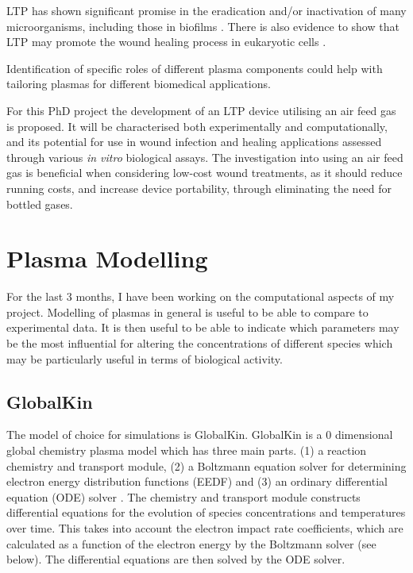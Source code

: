 \documentclass[11pt, oneside]{article}   	%
\begin{document}
LTP has shown significant promise in the eradication and/or inactivation of many microorganisms, including those in biofilms \cite{Laroussi2005low}. 
There is also evidence to show that LTP may promote the wound healing process in eukaryotic cells \cite{Haertel2014nonthermal, Kramer2013suitability}.


Identification of specific roles of different plasma components could help with tailoring plasmas for different biomedical applications.

For this PhD project the development of an LTP device utilising an air feed gas is proposed.
It will be characterised both experimentally and computationally, and its potential for use in wound infection and healing applications assessed through various \textit{in vitro} biological assays.
The investigation into using an air feed gas is beneficial when considering low-cost wound treatments, as it should reduce running costs, and increase device portability, through eliminating the need for bottled gases.

\section*{Plasma Modelling}
For the last 3 months, I have been working on the computational aspects of my project.
Modelling of plasmas in general is useful to be able to compare to experimental data. 
It is then useful to be able to indicate which parameters may be the most influential for altering the concentrations of different species which may be particularly useful in terms of biological activity.

\subsection*{GlobalKin}
The model of choice for simulations is GlobalKin.
GlobalKin is a 0 dimensional global chemistry plasma model which has three main parts. (1) a reaction chemistry and transport module, (2) a Boltzmann equation solver for determining electron energy distribution functions (EEDF) and (3) an ordinary differential equation (ODE) solver \cite{Stafford2004O2}.
The chemistry and transport module constructs differential equations for the evolution of species concentrations and temperatures over time. 
This takes into account the electron impact rate coefficients, which are calculated as a function of the electron energy by the Boltzmann solver (see below).
The differential equations are then solved by the ODE solver.
\end{document}
